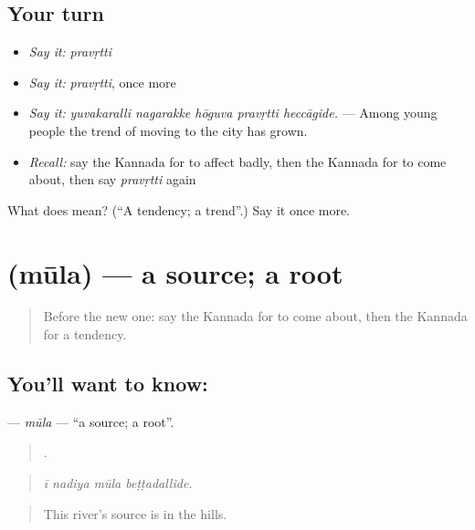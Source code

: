 \subsection*{Your turn}
\begin{itemize}
\raggedright
  \item \emph{Say it:} \emph{pravṛtti}
  \item \emph{Say it:} \emph{pravṛtti}, once more
  \item \emph{Say it:} \emph{yuvakaralli nagarakke hōguva pravṛtti heccāgide.} — Among young people the trend of moving to the city has grown.
  \item \emph{Recall:} say the Kannada for to affect badly, then the Kannada for to come about, then say \emph{pravṛtti} again
\end{itemize}

\begin{tcolorbox}[breakable,colback=teal!4,colframe=teal!35!black,title={Before you move on}]
What does  mean? (\textquotedblleft{}A tendency; a trend\textquotedblright{}.) Say it once more.
\end{tcolorbox}
\section[\texorpdfstring{\kn{ಮೂಲ} (mūla)}{ಮೂಲ (mūla)}]{ (mūla) — a source; a root}

\label{lesson:KA-C385-mula}



\begin{quote}
Before the new one: say the Kannada for to come about, then the Kannada for a tendency.
\end{quote}

\subsection*{You'll want to know: }
\textbf{} — \emph{mūla} — \textquotedblleft{}a source; a root\textquotedblright{}.

\begin{quote}
   .
\end{quote}

\begin{quote}
\emph{ī nadiya mūla beṭṭadallide.}
\end{quote}

\begin{quote}
This river's source is in the hills.
\end{quote}

